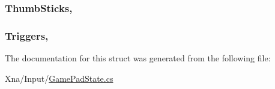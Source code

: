 \subsubsection[{Thumb\+Sticks}]{ Thumb\+Sticks\hspace{0.3cm}{\ttfamily [get]}, {\ttfamily [set]}}\label{structMicrosoft_1_1Xna_1_1Framework_1_1Input_1_1GamePadState_afe56937b1ebd5564f9223153e6f5b20c}
\hypertarget{structMicrosoft_1_1Xna_1_1Framework_1_1Input_1_1GamePadState_af580afe1ca00c6033408f634d61e7dea}{}
\subsubsection[{Triggers}]{ Triggers\hspace{0.3cm}{\ttfamily [get]}, {\ttfamily [set]}}\label{structMicrosoft_1_1Xna_1_1Framework_1_1Input_1_1GamePadState_af580afe1ca00c6033408f634d61e7dea}


The documentation for this struct was generated from the following file\+:\begin{DoxyCompactItemize}
\item 
Xna/\+Input/\hyperlink{GamePadState_8cs}{Game\+Pad\+State.\+cs}\end{DoxyCompactItemize}
